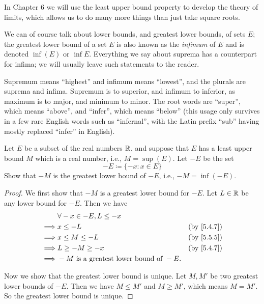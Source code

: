 \begin{rmk}\label{5.5.14}
  In Chapter 6 we will use the least upper bound property to develop the theory of limits, which allows us to do many more things than just take square roots.
\end{rmk}

\begin{rmk}\label{5.5.15}
  We can of course talk about lower bounds, and greatest lower bounds, of sets \(E\);
  the greatest lower bound of a set \(E\) is also known as the \emph{infimum} of \(E\) and is denoted \(\inf(E)\) or \(\inf E\).
  Everything we say about suprema has a counterpart for infima;
  we will usually leave such statements to the reader.
\end{rmk}

\begin{note}
  Supremum means ``highest'' and infimum means ``lowest'', and the plurals are suprema and infima.
  Supremum is to superior, and infimum to inferior, as maximum is to major, and minimum to minor.
  The root words are ``super'', which means ``above'', and ``infer'', which means ``below''
  (this usage only survives in a few rare English words such as ``infernal'', with the Latin prefix ``sub'' having mostly replaced ``infer'' in English).
\end{note}

\exercisesection

\begin{ex}\label{ex:5.5.1}
  Let \(E\) be a subset of the real numbers \(\mathbb{R}\), and suppose that \(E\) has a least upper bound \(M\) which is a real number, i.e., \(M = \sup(E)\).
  Let \(-E\) be the set
  \[
    -E \coloneqq \{-x : x \in E\}
  \]
  Show that \(-M\) is the greatest lower bound of \(-E\), i.e., \(-M = \inf(-E)\).
\end{ex}

\begin{proof}
  We first show that \(-M\) is a greatest lower bound for \(-E\).
  Let \(L \in \mathbb{R}\) be any lower bound for \(-E\).
  Then we have
  \begin{align*}
             & \forall -x \in -E, L \leq -x                                            \\
    \implies & x \leq -L                                    & \text{(by \cref{5.4.7})} \\
    \implies & x \leq M \leq -L                             & \text{(by \cref{5.5.5})} \\
    \implies & L \geq -M \geq -x                            & \text{(by \cref{5.4.7})} \\
    \implies & -M \text{ is a greatest lower bound of } -E.
  \end{align*}

  Now we show that the greatest lower bound is unique.
  Let \(M, M'\) be two greatest lower bounds of \(-E\).
  Then we have \(M \leq M'\) and \(M \geq M'\), which means \(M = M'\).
  So the greatest lower bound is unique.
\end{proof}

